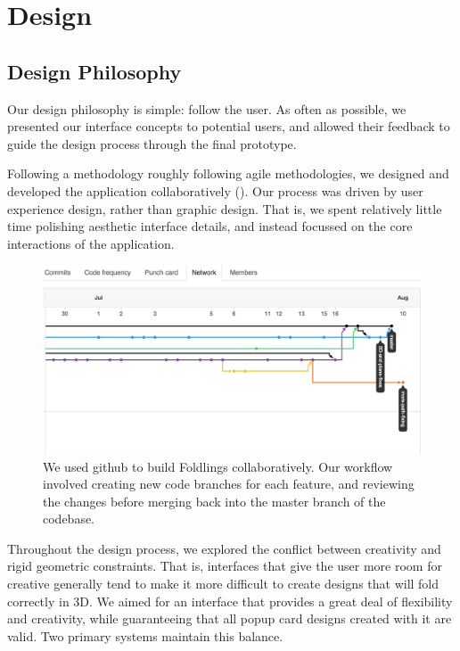\chapter{Design}

\section{Design Philosophy}\label{design-philosophy}

Our design philosophy is simple: follow the user. As often as possible,
we presented our interface concepts to potential users, and allowed
their feedback to guide the design process through the final prototype.

Following a methodology roughly following agile methodologies, we
designed and developed the application collaboratively
(\citet{martin2003agile}). Our process was driven by user experience
design, rather than graphic design. That is, we spent relatively little
time polishing aesthetic interface details, and instead focussed on the
core interactions of the application.

\begin{figure}[htbp]
\centering
\includegraphics{figures/30_UI_Design_Philosophy/gitflow.png}
\caption{We used github to build Foldlings collaboratively. Our workflow
involved creating new code branches for each feature, and reviewing the
changes before merging back into the master branch of the codebase.}
\end{figure}

Throughout the design process, we explored the conflict between
creativity and rigid geometric constraints. That is, interfaces that
give the user more room for creative generally tend to make it more
difficult to create designs that will fold correctly in 3D. We aimed for
an interface that provides a great deal of flexibility and creativity,
while guaranteeing that all popup card designs created with it are
valid. Two primary systems maintain this balance.

